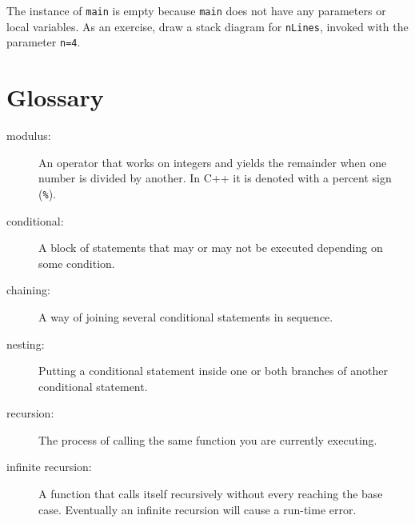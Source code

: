 The instance of {\tt main} is empty because {\tt main} does not
have any parameters or local variables.  As an exercise, draw a
stack diagram for {\tt nLines}, invoked with the parameter {\tt n=4}.


\section{Glossary}

\begin{description}

\item[modulus:]  An operator that works on integers and yields
the remainder when one number is divided by another.  In C++
it is denoted with a percent sign ({\tt \%}).

\item[conditional:]  A block of statements that may or may not
be executed depending on some condition.

\item[chaining:]  A way of joining several conditional statements
in sequence.

\item[nesting:] Putting a conditional statement inside one or both
branches of another conditional statement.

\item[recursion:]  The process of calling the same function you
are currently executing.

\item[infinite recursion:]  A function that calls itself
recursively without every reaching the base case.  Eventually
an infinite recursion will cause a run-time error.


\end{description}


